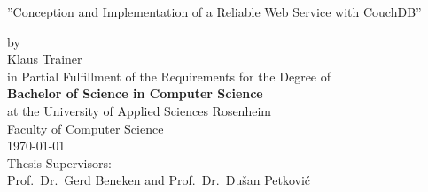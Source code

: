 \begin{titlepage}


\vspace{10em}
\center

\Huge{\sf ''Conception and Implementation of a Reliable Web Service with CouchDB''}
\vspace{2em}

\Large{\sf
    by\\Klaus Trainer\\
}
\vspace{2em}
\Large{\sf
    in Partial Fulfillment of the Requirements for the Degree of\\
    {\bf Bachelor of Science in Computer Science}
    \vspace{2em}
    \\
    at the University of Applied Sciences Rosenheim\\
    Faculty of Computer Science\\
    \today
}
\vspace{3em}
\\
\Large{\sf
    Thesis Supervisors:\\
    Prof.\ Dr.\ Gerd Beneken and Prof.\ Dr.\ Dušan Petković
}

\end{titlepage}
